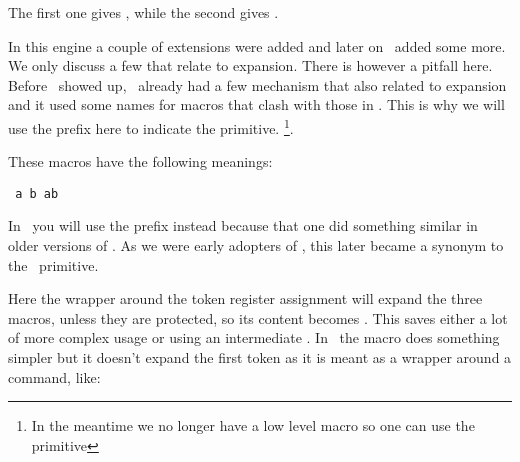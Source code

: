 \typebuffer[a][option=TEX]

\startbuffer[b]
\bgroup
\advance{}
\expandafter
\egroup
\the\scratchcounter
\stopbuffer

\typebuffer[b][option=TEX]

The first one gives \inlinebuffer[a], while the second gives \inlinebuffer[b].


\stopsection

\startsection[title={\ETEX\ primitives}]

In this engine a couple of extensions were added and later on \PDFTEX\ added some
more. We only discuss a few that relate to expansion. There is however a pitfall
here. Before \ETEX\ showed up, \CONTEXT\ already had a few mechanism that also
related to expansion and it used some names for macros that clash with those in
\ETEX. This is why we will use the \type {\normal} prefix here to indicate the
primitive. \footnote {In the meantime we no longer have a low level \type
{\protected} macro so one can use the primitive}.

\startbuffer
\def\MyMacroA{a}
\def\MyMacroB{b}
\normalprotected{}
\edef\MyMacroABC{\MyMacroA\MyMacroB\MyMacroC}
\stopbuffer

\typebuffer[option=TEX] \getbuffer

These macros have the following meanings:

\startlines \tt
\meaning\MyMacroA
\meaning\MyMacroB
\meaning\MyMacroC
\meaning\MyMacroABC
\stoplines

In \CONTEXT\ you will use the \type {\unexpanded} prefix instead because that one
did something similar in older versions of \CONTEXT. As we were early adopters of
\ETEX, this later became a synonym to the \ETEX\ primitive.

\startbuffer
\def\MyMacroA{a}
\def\MyMacroB{b}
\normalprotected{}
\normalexpanded{\scratchtoks{\MyMacroA\MyMacroB\MyMacroC}}
\stopbuffer

\typebuffer[option=TEX] \getbuffer

Here the wrapper around the token register assignment will expand the three
macros, unless they are protected, so its content becomes \MyShow. This saves
either a lot of more complex \type {\expandafter} usage or using an intermediate
\type {\edef}. In \CONTEXT\ the \type {\expanded} macro does something simpler
but it doesn't expand the first token as it is meant as a wrapper around a command,
like:

